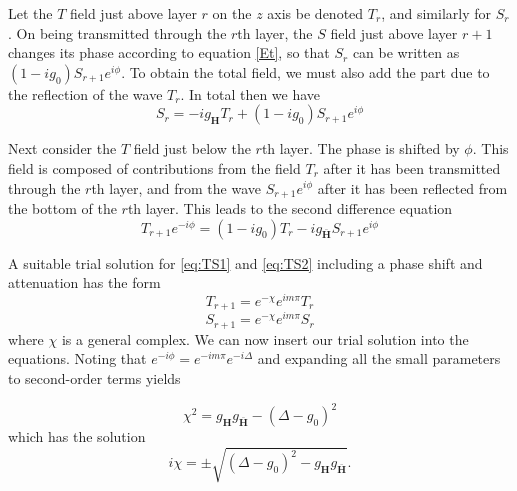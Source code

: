 \documentclass[12pt,oneside,notitlepage,abstracton,a4paper]{scrartcl}
\begin{document}
Let the $T$ field just above layer $r$ on the $z$ axis be denoted $T_r$, and similarly for $S_r$. On being transmitted through the $r$th layer, the $S$ field just above layer $r+1$ changes its phase according to equation \ref{Et}, so that $S_r$ can be written as $(1-ig_0)S_{r+1}e^{i\phi}$. To obtain the total field, we must also add the part due to the reflection of the wave $T_r$. In total then we have
\begin{equation}\label{eq:TS1}
 S_r=-ig_\mathbf{H}T_r+(1-ig_0)S_{r+1}e^{i\phi}
\end{equation}

Next consider the $T$ field just below the $r$th layer. The phase is shifted by $\phi$. This field is composed of contributions from the field $T_r$ after it has been transmitted through the $r$th layer, and from the wave $S_{r+1}e^{i\phi}$ after it has been reflected from the bottom of the $r$th layer. This leads to the second difference equation
\begin{equation}\label{eq:TS2}
 T_{r+1}e^{-i\phi}=(1-ig_0)T_r-ig_\mathbf{\bar{H}}S_{r+1}e^{i\phi}
\end{equation}

A suitable trial solution for \ref{eq:TS1} and \ref{eq:TS2} including a phase shift and attenuation has the form
\begin{equation}
T_{r+1}=e^{-\chi}e^{im\pi}T_r
\end{equation}
\begin{equation}
S_{r+1}=e^{-\chi}e^{im\pi}S_r
\end{equation}
where $\chi$ is a general complex. We can now insert our trial solution into the equations. Noting that $e^{-i\phi}=e^{-im\pi}e^{-i\Delta}$ and expanding all the small parameters to second-order terms yields

\begin{equation}
\chi^2=g_\mathbf{H}g_\mathbf{\bar{H}}-(\Delta-g_0)^2
\end{equation}
which has the solution
\begin{equation}
i\chi=\pm \sqrt{(\Delta-g_0)^2-g_\mathbf{H}g_\mathbf{\bar{H}}}.
\end{equation}
\end{document}

